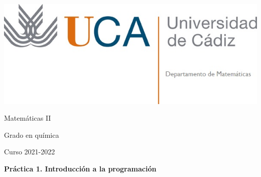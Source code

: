 \documentclass{article}
\title{}
\author{}
\date{}
\begin{document}
\begin{minipage}{.4\textwidth}
	\includegraphics[width=\linewidth]{uca.jpg}
\end{minipage}
%
\begin{minipage}{.6\textwidth}
	\begin{flushright}
		{\Large Matemáticas II}

		\medskip
		{\large Grado en química}

		\medskip
		Curso 2021-2022
	\end{flushright}
\end{minipage}

\medskip
\textbf{\Large Práctica 1. Introducción a la programación}

%
%
%
%
%


\end{document}
